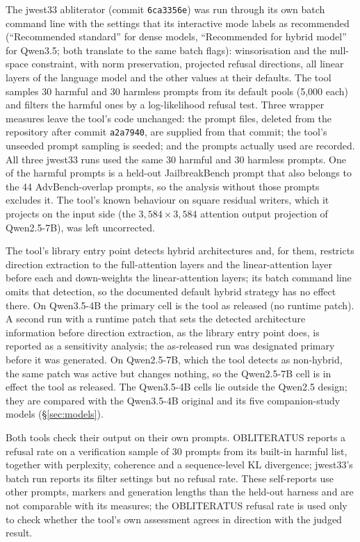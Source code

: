 The jwest33 abliterator \cite{jwest33abliterator} (commit \texttt{6ca3356e}) was run through its own batch command
line with the settings that its interactive mode labels as recommended (``Recommended standard'' for dense models,
``Recommended for hybrid model'' for Qwen3.5; both translate to the same batch flags): winsorisation and the
null-space constraint, with norm preservation, projected refusal directions, all linear layers of the language model
and the other values at their defaults. The tool samples 30 harmful and 30 harmless prompts from its default pools
(5{,}000 each) and filters the harmful ones by a log-likelihood refusal test. Three wrapper measures leave the
tool's code unchanged: the prompt files, deleted from the repository after commit \texttt{a2a7940}, are supplied
from that commit; the tool's unseeded prompt sampling is seeded; and the prompts actually used are recorded. All
three jwest33 runs used the same 30 harmful and 30 harmless prompts. One of the harmful prompts is a held-out
JailbreakBench prompt that also belongs to the 44 AdvBench-overlap prompts, so the analysis without those prompts
excludes it. The tool's known behaviour on square residual writers, which it projects on the input side (the
$3{,}584\times3{,}584$ attention output projection of Qwen2.5-7B), was left uncorrected.

The tool's library entry point detects hybrid architectures and, for them, restricts direction extraction to the
full-attention layers and the linear-attention layer before each and down-weights the linear-attention layers; its
batch command line omits that detection, so the documented default hybrid strategy has no effect there. On
Qwen3.5-4B the primary cell is the tool as released (no runtime patch). A second run with a runtime patch that sets
the detected architecture information before direction extraction, as the library entry point does, is reported as
a sensitivity analysis; the as-released run was designated primary before it was generated. On Qwen2.5-7B, which the
tool detects as non-hybrid, the same patch was active but changes nothing, so the Qwen2.5-7B cell is in effect the
tool as released. The Qwen3.5-4B cells lie outside the Qwen2.5 design; they are compared with the Qwen3.5-4B
original and its five companion-study models (\S\ref{sec:models}).

Both tools check their output on their own prompts. OBLITERATUS reports a refusal rate on a verification sample of 30
prompts from its built-in harmful list, together with perplexity, coherence and a sequence-level KL divergence;
jwest33's batch run reports its filter settings but no refusal rate. These self-reports use other prompts, markers
and generation lengths than the held-out harness and are not comparable with its measures; the OBLITERATUS refusal
rate is used only to check whether the tool's own assessment agrees in direction with the judged result.

